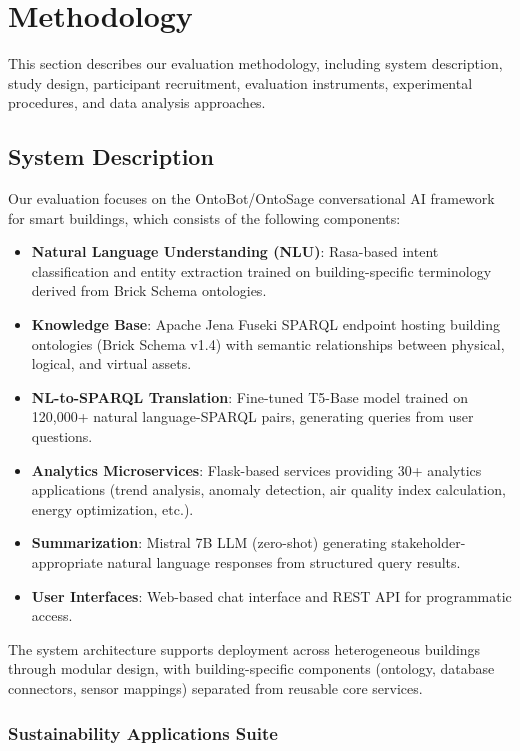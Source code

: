 \documentclass[acmlarge]{acmart}
\begin{document}
\section{Methodology}
\label{sec:methodology}

This section describes our evaluation methodology, including system description, study design, participant recruitment, evaluation instruments, experimental procedures, and data analysis approaches.

\subsection{System Description}

Our evaluation focuses on the OntoBot/OntoSage conversational AI framework for smart buildings, which consists of the following components:

\begin{itemize}
    \item \textbf{Natural Language Understanding (NLU)}: Rasa-based intent classification and entity extraction trained on building-specific terminology derived from Brick Schema ontologies.
    \item \textbf{Knowledge Base}: Apache Jena Fuseki SPARQL endpoint hosting building ontologies (Brick Schema v1.4) with semantic relationships between physical, logical, and virtual assets.
    \item \textbf{NL-to-SPARQL Translation}: Fine-tuned T5-Base model trained on 120,000+ natural language-SPARQL pairs, generating queries from user questions.
    \item \textbf{Analytics Microservices}: Flask-based services providing 30+ analytics applications (trend analysis, anomaly detection, air quality index calculation, energy optimization, etc.).
    \item \textbf{Summarization}: Mistral 7B LLM (zero-shot) generating stakeholder-appropriate natural language responses from structured query results.
    \item \textbf{User Interfaces}: Web-based chat interface and REST API for programmatic access.
\end{itemize}

The system architecture supports deployment across heterogeneous buildings through modular design, with building-specific components (ontology, database connectors, sensor mappings) separated from reusable core services.

\subsubsection{Sustainability Applications Suite}
\end{document}
